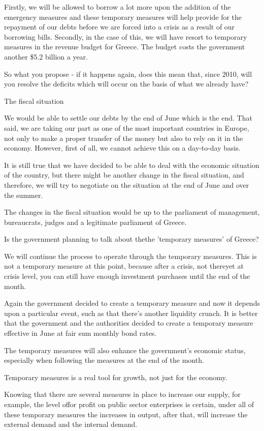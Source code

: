 \documentclass{article} %
\begin{document}
{\begin{appendices}
{Firstly, we will be allowed to borrow a lot more upon the addition of the emergency measures and these temporary measures will help provide for the repayment of our debts before we are forced into a crisis as a result of our borrowing bills. Secondly, in the case of this, we will have resort to temporary measures in the revenue budget for Greece. The budget costs the government another \$5.2 billion a year.

So what you propose - if it happens again, does this mean that, since 2010, will you resolve the deficits which will occur on the basis of what we already have?

The fiscal situation

We would be able to settle our debts by the end of June which is the end. That said, we are taking our part as one of the most important countries in Europe, not only to make a proper transfer of the money but also to rely on it in the economy. However, first of all, we cannot achieve this on a day-to-day basis.

It is still true that we have decided to be able to deal with the economic situation of the country, but there might be another change in the fiscal situation, and therefore, we will try to negotiate on the situation at the end of June and over the summer.

The changes in the fiscal situation would be up to the parliament of management, bureaucrats, judges and a legitimate parliament of Greece.

Is the government planning to talk about thethe 'temporary measures' of Greece?

We will continue the process to operate through the temporary measures. This is not a temporary measure at this point, because after a crisis, not thereyet at crisis level, you can still have enough investment purchases until the end of the month.

Again the government decided to create a temporary measure and now it depends upon a particular event, such as that there's another liquidity crunch. It is better that the government and the authorities decided to create a temporary measure effective in June at fair sum monthly bond rates.

The temporary measures will also enhance the government's economic status, especially when following the measures at the end of the month.

Temporary measures is a real tool for growth, not just for the economy.

Knowing that there are several measures in place to increase our supply, for example, the level offor profit on public sector enterprises is certain, under all of these temporary measures the increases in output, after that, will increase the external demand and the internal demand.

}
\end{appendices}}
\end{document}
